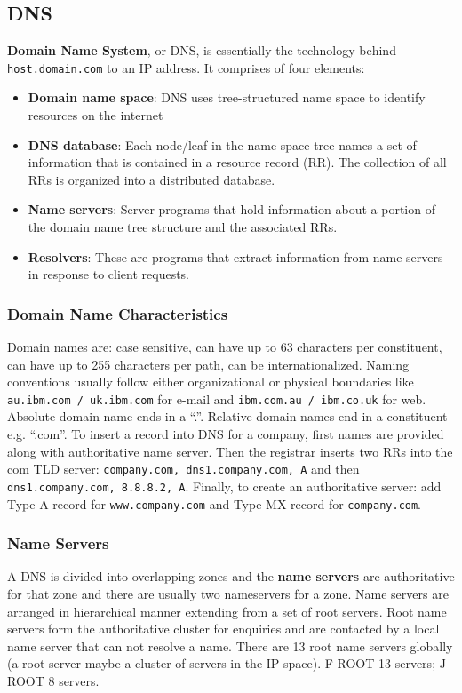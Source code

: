 \documentclass[twoside]{article}
\begin{document}
\subsection{DNS}
\textbf{Domain Name System}, or DNS, is essentially the technology behind 
\texttt{host.domain.com} to an IP address. It comprises of four elements:
\begin{itemize}
    \item \textbf{Domain name space}: DNS uses tree-structured name space to 
    identify resources on the internet
    \item \textbf{DNS database}: Each node/leaf in the name space tree names a 
    set of information that is contained in a resource record (RR). The 
    collection of all RRs is organized into a distributed database.
    \item \textbf{Name servers}: Server programs that hold information about a 
    portion of the domain name tree structure and the associated RRs.
    \item \textbf{Resolvers}: These are programs that extract information from 
    name servers in response to client requests.
\end{itemize}
\subsubsection{Domain Name Characteristics}
Domain names are: case sensitive, can have up to 63 characters per constituent,
can have up to 255 characters per path, can be internationalized. Naming 
conventions usually follow either organizational or physical boundaries like 
\texttt{au.ibm.com / uk.ibm.com} for e-mail and \texttt{ibm.com.au / ibm.co.uk} 
for web. Absolute domain name ends in a ``.''. Relative domain names end in a 
constituent e.g. ``.com''. To insert a record into DNS for a company, first
names are provided along with authoritative name server. Then the registrar 
inserts two RRs into the com TLD server: \texttt{company.com, dns1.company.com, A}
and then \texttt{dns1.company.com, 8.8.8.2, A}. Finally, to create an authoritative
server: add Type A record for \texttt{www.company.com} and Type MX record for
\texttt{company.com}.
\subsubsection{Name Servers}
A DNS is divided into overlapping zones and the \textbf{name servers} are authoritative 
for that zone and there are usually two nameservers for a zone. Name servers are
arranged in hierarchical manner extending from a set of root servers. Root name
servers form the authoritative cluster for enquiries and are contacted by a local
name server that can not resolve a name. There are 13 root name servers globally
(a root server maybe a cluster of servers in the IP space). F-ROOT 13 servers;
J-ROOT 8 servers. \\
\end{document}
